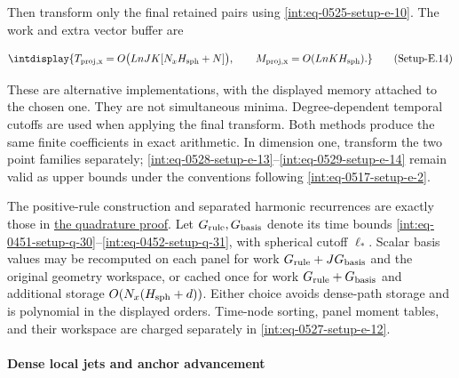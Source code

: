 
Then transform only the final retained pairs using \hyperref[int:eq-setup-e-10]{\eqref{int:eq-0525-setup-e-10}}. The work and extra vector buffer are


\label{int:eq-setup-e-14}
\begingroup\renewcommand{\theHequation}{intdisplay.1016}
\begin{equation}
\intdisplay{
T_{\rm proj,x}=O\bigl(LnJK[N_xH_{\rm sph}+N]\bigr),\qquad
M_{\rm proj,x}=O(LnKH_{\rm sph}).
}
\tag{Setup-E.14}
\label{int:eq-0529-setup-e-14}
\end{equation}
\endgroup


These are alternative implementations, with the displayed memory attached to the chosen one. They are not simultaneous minima. Degree-dependent temporal cutoffs are used when applying the final transform. Both methods produce the same finite coefficients in exact arithmetic. In dimension one, transform the two point families separately; \hyperref[int:eq-setup-e-13]{\eqref{int:eq-0528-setup-e-13}}--\allowbreak \hyperref[int:eq-setup-e-14]{\eqref{int:eq-0529-setup-e-14}} remain valid as upper bounds under the conventions following \hyperref[int:eq-setup-e-2]{\eqref{int:eq-0517-setup-e-2}}.



The positive-rule construction and separated harmonic recurrences are exactly those in \hyperref[int:setup-quadrature]{the quadrature proof}. Let \(G_{\rm rule},\allowbreak G_{\rm basis}\) denote its time bounds \hyperref[int:eq-setup-q-30]{\eqref{int:eq-0451-setup-q-30}}--\allowbreak \hyperref[int:eq-setup-q-31]{\eqref{int:eq-0452-setup-q-31}}, with spherical cutoff \(\ell_*\). Scalar basis values may be recomputed on each panel for work \(G_{\rm rule}+JG_{\rm basis}\) and the original geometry workspace, or cached once for work \(G_{\rm rule}+G_{\rm basis}\) and additional storage \(O(N_x(H_{\rm sph}+d))\). Either choice avoids dense-path storage and is polynomial in the displayed orders. Time-node sorting, panel moment tables, and their workspace are charged separately in \hyperref[int:eq-setup-e-12]{\eqref{int:eq-0527-setup-e-12}}.


\paragraph{Dense local jets and anchor advancement}
\label{int:setup-assembly-4}
\mbox{}\par\smallskip

